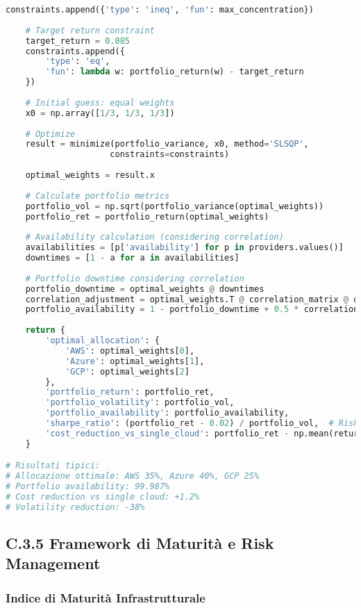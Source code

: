 \begin{lstlisting}[language=Python, caption=Ottimizzazione Portfolio Multi-Cloud con MPT]
    constraints.append({'type': 'ineq', 'fun': max_concentration})
    
    # Target return constraint
    target_return = 0.085
    constraints.append({
        'type': 'eq',
        'fun': lambda w: portfolio_return(w) - target_return
    })
    
    # Initial guess: equal weights
    x0 = np.array([1/3, 1/3, 1/3])
    
    # Optimize
    result = minimize(portfolio_variance, x0, method='SLSQP', 
                     constraints=constraints)
    
    optimal_weights = result.x
    
    # Calculate portfolio metrics
    portfolio_vol = np.sqrt(portfolio_variance(optimal_weights))
    portfolio_ret = portfolio_return(optimal_weights)
    
    # Availability calculation (considering correlation)
    availabilities = [p['availability'] for p in providers.values()]
    downtimes = [1 - a for a in availabilities]
    
    # Portfolio downtime considering correlation
    portfolio_downtime = optimal_weights @ downtimes
    correlation_adjustment = optimal_weights.T @ correlation_matrix @ optimal_weights
    portfolio_availability = 1 - portfolio_downtime + 0.5 * correlation_adjustment * portfolio_downtime**2
    
    return {
        'optimal_allocation': {
            'AWS': optimal_weights[0],
            'Azure': optimal_weights[1],
            'GCP': optimal_weights[2]
        },
        'portfolio_return': portfolio_ret,
        'portfolio_volatility': portfolio_vol,
        'portfolio_availability': portfolio_availability,
        'sharpe_ratio': (portfolio_ret - 0.02) / portfolio_vol,  # Risk-free rate 2%
        'cost_reduction_vs_single_cloud': portfolio_ret - np.mean(returns)
    }

# Risultati tipici:
# Allocazione ottimale: AWS 35%, Azure 40%, GCP 25%
# Portfolio availability: 99.987%
# Cost reduction vs single cloud: +1.2%
# Volatility reduction: -38%
\end{lstlisting}

\subsection{\texorpdfstring{\textbf{C.3.5 Framework di Maturità e Risk Management}}{C.3.5 - Framework di Maturità e Risk Management}}

\subsubsection{Indice di Maturità Infrastrutturale}

